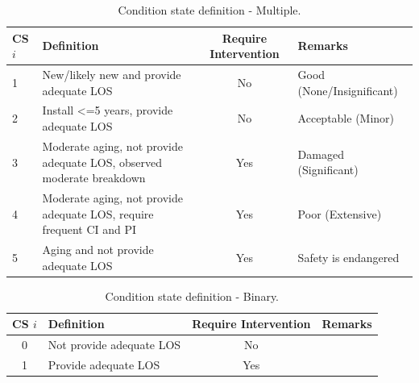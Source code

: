 \begin{table}[h]
	\caption{Condition state definition - Multiple.}
	\label{ch03:cs}
	{\footnotesize
\begin{tabular}{l|p{6cm}|l|l}
	\hline
	CS $i$ & Definition & \multicolumn{1}{c|}{Require Intervention} & Remarks \\ 
	\hline
	1 & New/likely new and provide adequate LOS & \multicolumn{1}{c|}{No} & Good (None/Insignificant) \\ 
	2 & Install <=5 years, provide adequate LOS & \multicolumn{1}{c|}{No} & Acceptable (Minor) \\ 
	3 & Moderate aging, not provide adequate LOS, observed moderate breakdown & \multicolumn{1}{c|}{Yes} &  Damaged (Significant)\\ 
	4 & Moderate aging, not provide adequate LOS, require frequent CI and PI & \multicolumn{1}{c|}{Yes} & Poor (Extensive) \\ 
	5 & Aging and not provide adequate LOS & \multicolumn{1}{c|}{Yes} & Safety is endangered  \\ 
	\hline
\end{tabular}
	}
\end{table}

\begin{table}[h]
	\caption{Condition state definition - Binary.}
	\label{ch03_csbinary}
	{\footnotesize
\begin{tabular}{l|p{6cm}|l|l}
	\hline
	\multicolumn{1}{c|}{CS $i$} & Definition & \multicolumn{1}{c|}{Require Intervention} & Remarks \\ 
	\hline
	\multicolumn{1}{c|}{0} & Not provide adequate LOS & \multicolumn{1}{c|}{No} &  \\ 
	\multicolumn{1}{c|}{1} & Provide adequate LOS & \multicolumn{1}{c|}{Yes} &  \\ 
	\hline
\end{tabular}
	}
\end{table}

